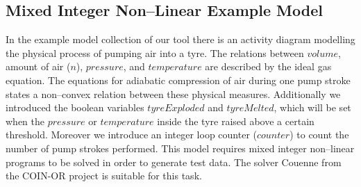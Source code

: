 \documentclass[runningheads,a4paper]{llncs}%
\begin{document}
\subsection{Mixed Integer Non--Linear Example Model}
\label{sec:exampleModelNonConvex}
In the example model collection of our tool there is an activity diagram modelling the physical process of pumping air into a tyre. The relations between $volume$, amount of air ($n$), $pressure$, and $temperature$ are described by the ideal gas equation. The equations for adiabatic compression of air during one pump stroke states a non--convex relation between these physical measures. Additionally we introduced the boolean variables $tyreExploded$ and $tyreMelted$, which will be set when the $pressure$ or $temperature$ inside the tyre raised above a certain threshold. Moreover we introduce an integer loop counter ($counter$) to count the number of pump strokes performed. This model requires mixed integer non--linear programs to be solved in order to generate test data. The solver Couenne from the COIN-OR project is suitable for this task.
\end{document}
